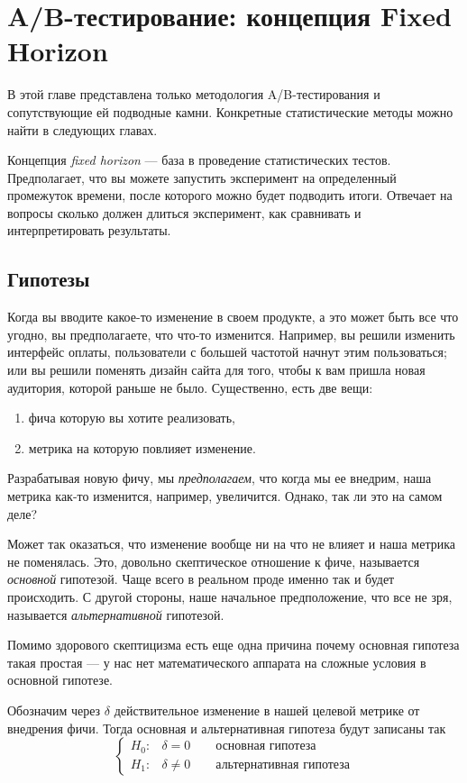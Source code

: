 \documentclass[../handbook.tex]{subfiles}
\begin{document}
\chapter{A\slash B-тестирование: концепция Fixed Horizon}

В этой главе представлена только методология A/B-тестирования и сопутствующие
ей подводные камни. Конкретные статистические методы можно найти в следующих
главах.

Концепция \emph{fixed horizon} --- база в проведение статистических тестов.
Предполагает, что вы можете запустить эксперимент на определенный промежуток
времени, после которого можно будет подводить итоги. Отвечает на вопросы
сколько должен длиться эксперимент, как сравнивать и интерпретировать
результаты.

\section{Гипотезы}

Когда вы вводите какое-то изменение в своем продукте, а это может быть все что
угодно, вы предполагаете, что что-то изменится. Например, вы решили изменить
интерфейс оплаты, пользователи с большей частотой начнут этим пользоваться; или
вы решили поменять дизайн сайта для того, чтобы к вам пришла новая аудитория,
которой раньше не было. Существенно, есть две вещи:
\begin{enumerate}
    \item фича которую вы хотите реализовать,
    \item метрика на которую повлияет изменение.
\end{enumerate}
Разрабатывая новую фичу, мы \emph{предполагаем}, что когда мы ее внедрим, наша
метрика как-то изменится, например, увеличится. Однако, так ли это на самом
деле?

Может так оказаться, что изменение вообще ни на что не влияет и наша метрика не
поменялась. Это, довольно скептическое отношение к фиче, называется
\emph{основной} гипотезой. Чаще всего в реальном проде именно так и будет
происходить. С другой стороны, наше начальное предположение, что все не зря,
называется \emph{альтернативной} гипотезой.

Помимо здорового скептицизма есть еще одна причина почему основная гипотеза
такая простая --- у нас нет математического аппарата на сложные условия в
основной гипотезе.

Обозначим через $\delta$ действительное изменение в нашей целевой метрике от внедрения фичи. Тогда основная и альтернативная гипотеза будут записаны так
\begin{equation*}
    \begin{cases}
        H_0: & \delta = 0 \qquad\text{основная гипотеза}\\
        H_1: & \delta \ne 0 \qquad\text{альтернативная гипотеза}
    \end{cases}
\end{equation*}
\end{document}
